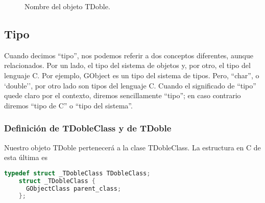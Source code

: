 \begin{figure}[ht]
  \centering
  \def\scl{1}
\caption{Nombre del objeto \textsf{TDoble}.}
\label{fig:nombre-objetos}
\end{figure}

\subsection{Tipo}
Cuando decimos ``tipo'', nos podemos referir a dos conceptos diferentes, aunque relacionados.
Por un lado, el tipo del sistema de objetos y, por otro, el tipo del lenguaje C. Por ejemplo, \textsf{GObject} es
un tipo del sistema de tipos. Pero, ``char'', o `double'', por otro lado son tipos del lenguaje C.
Cuando el significado de ``tipo'' quede claro por el contexto, diremos sencillamente ``tipo''; en caso contrario
diremos ``tipo de C'' o ``tipo del sistema''.

\subsubsection{Definición de \textsf{TDobleClass} y de \textsf{TDoble}}
  Nuestro objeto \textsf{TDoble} pertenecerá a la clase \textsf{TDobleClass}. La estructura en C de esta última es
  \begin{lstlisting}[language=C]
    typedef struct _TDobleClass TDobleClass;
    struct _TDobleClass {
      GObjectClass parent_class;
    };
  \end{lstlisting}

